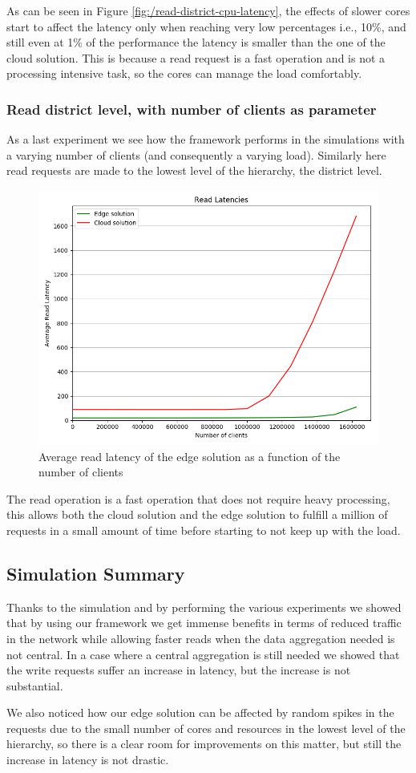 As can be seen in Figure \ref{fig:/read-district-cpu-latency}, the effects of slower cores start to affect the latency only when reaching very low percentages i.e., 10\%, and still even at 1\% of the performance the latency is smaller than the one of the cloud solution. This is because a read request is a fast operation and is not a processing intensive task, so the cores can manage the load comfortably.

\subsubsection{Read district level, with number of clients as parameter}
As a last experiment we see how the framework performs in the simulations with a varying number of clients (and consequently a varying load).
Similarly here read requests are made to the lowest level of the hierarchy, the district level.

\begin{figure}[H]
    \centering
    \includegraphics[width=0.86\linewidth]{Figures/Evaluation/read-district-clients-latency.png}
    \caption{Average read latency of the edge solution as a function of the number of clients}
    \label{fig:/read-district-clients-latency}
\end{figure}

The read operation is a fast operation that does not require heavy processing, this allows both the cloud solution and the edge solution to fulfill a million of requests in a small amount of time before starting to not keep up with the load.

\subsection{Simulation Summary}
Thanks to the simulation and by performing the various experiments we showed that by using our framework we get immense benefits in terms of reduced traffic in the network while allowing faster reads when the data aggregation needed is not central.
In a case where a central aggregation is still needed we showed that the write requests suffer an increase in latency, but the increase is not substantial.

We also noticed how our edge solution can be affected by random spikes in the requests due to the small number of cores and resources in the lowest level of the hierarchy, so there is a clear room for improvements on this matter, but still the increase in latency is not drastic.

